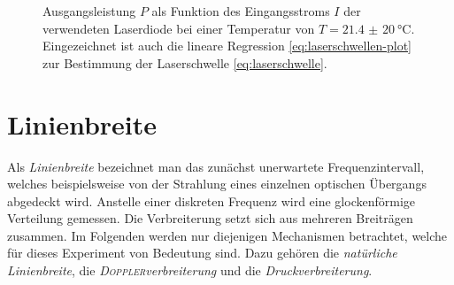 \documentclass[../bericht.tex]{subfiles}
\begin{document}
        \begin{figure}[tb]
          \caption{Ausgangsleistung $P$ als Funktion des Eingangsstroms $I$ der verwendeten Laserdiode bei einer Temperatur von $T=\SI{21,4(20)}{\celsius}$. Eingezeichnet ist auch die lineare Regression \cref{eq:laserschwellen-plot} zur Bestimmung der Laserschwelle \cref{eq:laserschwelle}.}
          \label{fig:laserschwelle}
        \end{figure}


    \section{Linienbreite}
    \label{sec:linienbreite}

      Als \textit{Linienbreite} bezeichnet man das zunächst unerwartete Frequenzintervall, welches beispielsweise von der Strahlung eines einzelnen optischen Übergangs abgedeckt wird. Anstelle einer diskreten Frequenz wird eine glockenförmige Verteilung gemessen. Die Verbreiterung setzt sich aus mehreren Breiträgen zusammen.  Im Folgenden werden nur diejenigen Mechanismen betrachtet, welche für dieses Experiment von Bedeutung sind. Dazu gehören die \textit{nat\"urliche Linienbreite}, die \textit{\textsc{Doppler}verbreiterung} und die \textit{Druckverbreiterung}.
\end{document}
